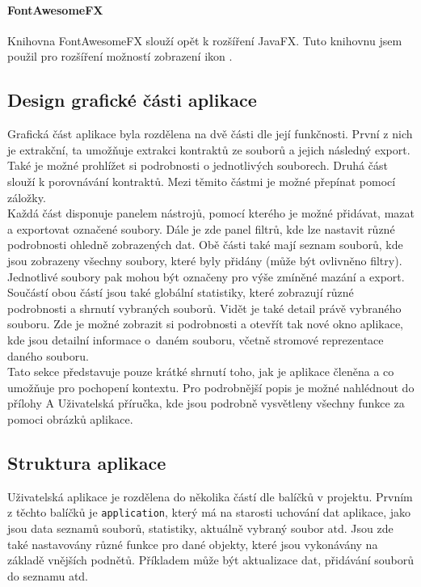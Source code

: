 			\paragraph{FontAwesomeFX} 	
				Knihovna FontAwesomeFX slouží opět k rozšíření JavaFX. Tuto knihovnu jsem použil pro rozšíření možností zobrazení ikon \cite{fontawesomefx}.	 
		
		\subsection{Design grafické části aplikace}
			Grafická část aplikace byla rozdělena na dvě části dle její funkčnosti. První z nich je extrakční, ta umožňuje extrakci kontraktů ze souborů a jejich následný export. Také je možné prohlížet si podrobnosti o jednotlivých souborech.  Druhá část slouží k porovnávání kontraktů. Mezi těmito částmi je možné přepínat pomocí záložky.\\
			
			Každá část disponuje panelem nástrojů, pomocí kterého je možné přidávat, mazat a exportovat označené soubory. Dále je zde panel filtrů, kde lze nastavit různé podrobnosti ohledně zobrazených dat. Obě části také mají seznam souborů, kde jsou zobrazeny všechny soubory, které byly přidány (může být ovlivněno filtry). Jednotlivé soubory pak mohou být označeny pro výše zmíněné mazání a export. Součástí obou částí jsou také globální statistiky, které zobrazují různé podrobnosti a shrnutí vybraných souborů. Vidět je také detail právě vybraného souboru. Zde je možné zobrazit si podrobnosti a otevřít tak nové okno aplikace, kde jsou detailní informace o~daném souboru, včetně stromové reprezentace daného souboru.\\
			
			Tato sekce představuje pouze krátké shrnutí toho, jak je aplikace členěna a co umožňuje pro pochopení kontextu. Pro podrobnější popis je možné nahlédnout do přílohy A Uživatelská příručka, kde jsou podrobně vysvětleny všechny funkce za pomoci obrázků aplikace.
		
		\subsection{Struktura aplikace}
			Uživatelská aplikace je rozdělena do několika částí dle balíčků v projektu. Prvním z těchto balíčků je \texttt{application}, který má na starosti uchování dat aplikace, jako jsou data seznamů souborů, statistiky, aktuálně vybraný soubor atd. Jsou zde také nastavovány různé funkce pro dané objekty, které jsou vykonávány na základě vnějších podnětů. Příkladem může být aktualizace dat, přidávání souborů do seznamu atd.\\
			
